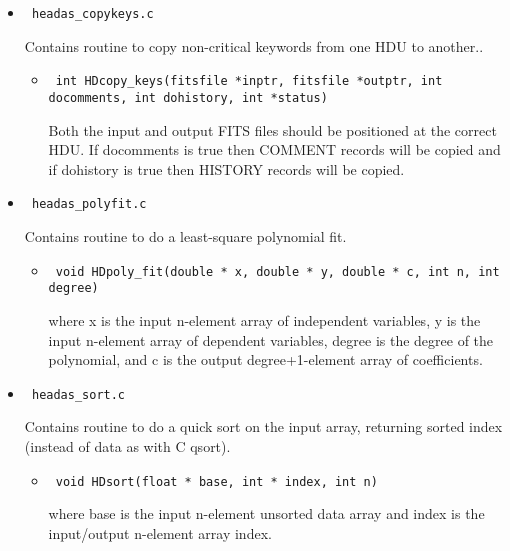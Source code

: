 \documentclass[11pt]{book}
\begin{document}
\begin{itemize}
\item            \begin{verbatim} headas_copykeys.c \end{verbatim}
            Contains routine to copy non-critical keywords from one
            HDU to another..
	    \begin{itemize}
            \item   \begin{verbatim} int HDcopy_keys(fitsfile *inptr, fitsfile *outptr, int docomments, int dohistory, int *status) \end{verbatim}
                  Both the input and output FITS files should be
                  positioned at the correct HDU. If docomments is true
                  then COMMENT records will be copied and if dohistory
                  is true then HISTORY records will be copied.
            \end{itemize}

\item            \begin{verbatim} headas_polyfit.c \end{verbatim}
            Contains routine to do a least-square polynomial fit.
	    \begin{itemize}
            \item   \begin{verbatim} void HDpoly_fit(double * x, double * y, double * c, int n, int degree) \end{verbatim}
                  where x is the input n-element array of independent variables,
                  y is the input n-element array of dependent variables,
                  degree is the degree of the polynomial, and c is
                  the output  degree+1-element array of coefficients.
            \end{itemize}

\item            \begin{verbatim} headas_sort.c \end{verbatim}
            Contains routine to do a quick sort on the input array,
            returning sorted index (instead of data as with C qsort). 
	    \begin{itemize}
            \item \begin{verbatim} void HDsort(float * base, int * index, int n) \end{verbatim}
                  where base is the input n-element unsorted data
                  array and index is the input/output n-element array index.
            \end{itemize}


\end{itemize}
\end{document}
